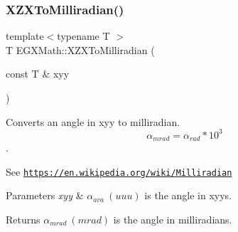 \subsubsection{\texorpdfstring{X\+Z\+X\+To\+Milliradian()}{XZXToMilliradian()}}
{\footnotesize\ttfamily template$<$typename T $>$ \\
T E\+G\+X\+Math\+::\+X\+Z\+X\+To\+Milliradian (\begin{DoxyParamCaption}\item[{const T \&}]{xyy }\end{DoxyParamCaption})}



Converts an angle in xyy to milliradian. \[\alpha_{mrad}=\alpha_{rad}*10^3\]. 

See \href{https://en.wikipedia.org/wiki/Milliradian}{\tt https\+://en.\+wikipedia.\+org/wiki/\+Milliradian} 
\begin{DoxyParams}{Parameters}
{\em xyy} & $\alpha_{ava}\ (uuu)$ is the angle in xyys. \\
\hline
\end{DoxyParams}
\begin{DoxyReturn}{Returns}
$\alpha_{mrad}\ (mrad)$ is the angle in milliradians. 
\end{DoxyReturn}

